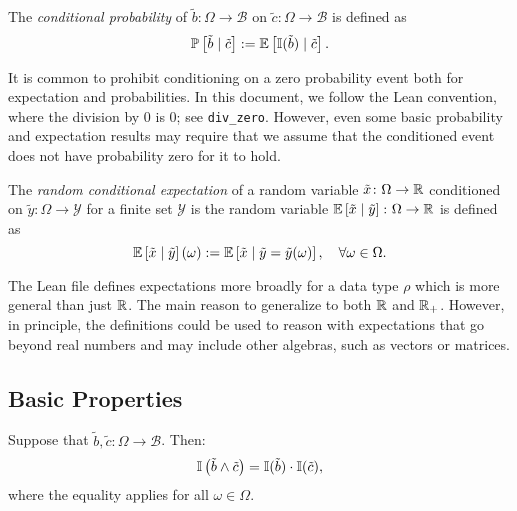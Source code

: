 \begin{definition} \label{def:probability_cnd}
The \emph{conditional probability} of $\tilde{b}\colon \Omega \to \mathcal{B}$ on $\tilde{c}\colon \Omega \to \mathcal{B}$ is defined as
\[
\mathbb{P}\left[ \tilde{b} \mid  \tilde{c} \right]  :=
\mathbb{E} \left[ \mathbb{I}(\tilde{b}) \mid  \tilde{c} \right].
\]
\end{definition}

\begin{remark}
It is common to prohibit conditioning on a zero probability event both for expectation and probabilities. In this document, we follow the Lean convention, where the division by $0$ is $0$; see \texttt{div\_zero}. However, even some basic probability and expectation results may require that we assume that the conditioned event does not have probability zero for it to hold. 
\end{remark}

\begin{definition} \label{def:expect-cnd-rv}
The \emph{random conditional expectation} of a random variable $\tilde{x} \colon \Omega \to \mathbb{R}$ conditioned on $\tilde{y} \colon \Omega \to \mathcal{Y}$ for a finite set $\mathcal{Y}$ is the random variable $\mathbb{E} \left[ \tilde{x} \mid  \tilde{y} \right]\colon \Omega \to \mathbb{R}$ is defined as
\[
\mathbb{E} \left[ \tilde{x} \mid  \tilde{y} \right](\omega)
:=
\mathbb{E} \left[ \tilde{x} \mid  \tilde{y} = \tilde{y}(\omega) \right], \quad \forall \omega \in \Omega.
\]
 \leanok
\end{definition}

\begin{remark}
The Lean file defines expectations more broadly for a data type $\rho$ which is more general than just $\mathbb{R}$. The main reason to generalize to both $\mathbb{R}$ and $\mathbb{R}_+$. However, in principle, the definitions could be used to reason with expectations that go beyond real numbers and may include other algebras, such as vectors or matrices.
\end{remark}

\subsection{Basic Properties}

\begin{lemma} \label{lem:ind-and-eq-prod-ind}
Suppose that $\tilde{b}, \tilde{c} \colon \Omega \to \mathcal{B}$. Then:
\[
\mathbb{I} \left( \tilde{b} \wedge \tilde{c} \right) = \mathbb{I} ( \tilde{b} ) \cdot  \mathbb{I} ( \tilde{c} ),  
\]
where the equality applies for all $\omega \in \Omega$.
\end{lemma}

